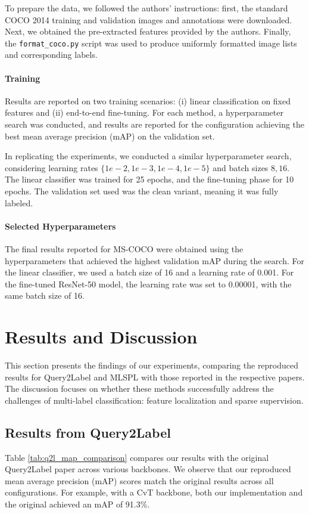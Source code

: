 \documentclass[lettersize,journal]{IEEEtran}
\begin{document}
To prepare the data, we followed the authors' instructions: first, the standard COCO 2014 training and validation images and annotations were downloaded. Next, we obtained the pre-extracted features provided by the authors. Finally, the \texttt{format\_coco.py} script was used to produce uniformly formatted image lists and corresponding labels.


\paragraph{Training}
Results are reported on two training scenarios: (i) linear classification on fixed features and (ii) end-to-end fine-tuning. For each method, a hyperparameter search was conducted, and results are reported for the configuration achieving the best mean average precision (mAP) on the validation set.

In replicating the experiments, we conducted a similar hyperparameter search, considering learning rates  $\{1e-2, 1e-3, 1e-4, 1e-5\}$ and batch sizes ${8, 16}$. The linear classifier was trained for 25 epochs, and the fine-tuning phase for 10 epochs. The validation set used was the clean variant, meaning it was fully labeled.

\paragraph{Selected Hyperparameters}
The final results reported for MS-COCO were obtained using the hyperparameters that achieved the highest validation mAP during the search. For the linear classifier, we used a batch size of 16 and a learning rate of 0.001. For the fine-tuned ResNet-50 model, the learning rate was set to 0.00001, with the same batch size of 16.


\section{Results and Discussion}
\label{sec:results}
This section presents the findings of our experiments, comparing the reproduced results for Query2Label and MLSPL with those reported in the respective papers. The discussion focuses on whether these methods successfully address the challenges of multi-label classification: feature localization and sparse supervision.



\subsection{Results from Query2Label}
Table \ref{tab:q2l_map_comparison} compares our results with the original Query2Label paper across various backbones. We observe that our reproduced mean average precision (mAP) scores match the original results across all configurations. For example, with a CvT backbone, both our implementation and the original achieved an mAP of 91.3\%.
\end{document}
